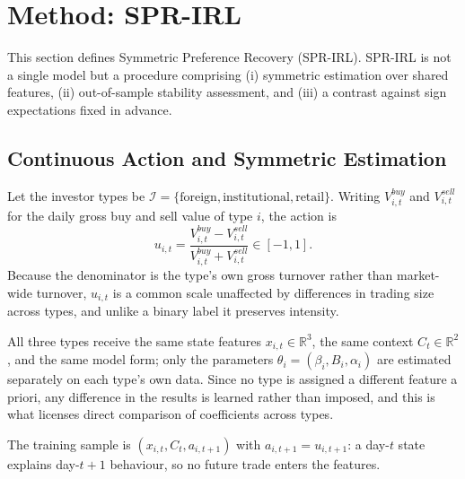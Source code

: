 %
%

\section{Method: SPR-IRL}
\label{sec:method}

This section defines Symmetric Preference Recovery (SPR-IRL). SPR-IRL is not a
single model but a procedure comprising (i) symmetric estimation over shared
features, (ii) out-of-sample stability assessment, and (iii) a contrast against
sign expectations fixed in advance.

\subsection{Continuous Action and Symmetric Estimation}
\label{sec:setup}

Let the investor types be
$\mathcal{I}=\{\text{foreign},\text{institutional},\text{retail}\}$. Writing
$V^{buy}_{i,t}$ and $V^{sell}_{i,t}$ for the daily gross buy and sell value of
type $i$, the action is
\begin{equation}
u_{i,t}=\frac{V^{buy}_{i,t}-V^{sell}_{i,t}}
             {V^{buy}_{i,t}+V^{sell}_{i,t}}\in[-1,1].
\label{eq:action}
\end{equation}
Because the denominator is the type's own gross turnover rather than
market-wide turnover, $u_{i,t}$ is a common scale unaffected by differences in
trading size across types, and unlike a binary label it preserves intensity.

All three types receive the same state features $x_{i,t}\in\mathbb{R}^{3}$, the
same context $C_t\in\mathbb{R}^{2}$, and the same model form; only the
parameters $\theta_i=(\beta_i,B_i,\alpha_i)$ are estimated separately on each
type's own data. Since no type is assigned a different feature a priori, any
difference in the results is learned rather than imposed, and this is what
licenses direct comparison of coefficients across types.

The training sample is $(x_{i,t},C_t,a_{i,t+1})$ with $a_{i,t+1}=u_{i,t+1}$: a
day-$t$ state explains day-$t+1$ behaviour, so no future trade enters the
features.

